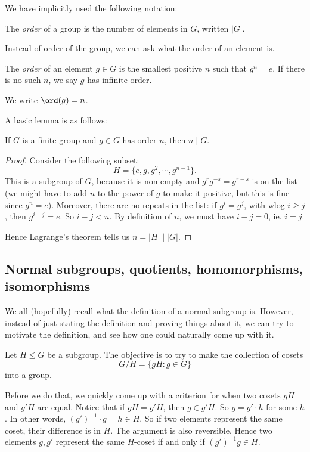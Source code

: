 \documentclass[a4paper]{article}
\begin{document}
We have implicitly used the following notation:
\begin{defi}
  The \emph{order} of a group is the number of elements in $G$, written $|G|$.
\end{defi}

Instead of order of the group, we can ask what the order of an element is.
\begin{defi}
  The \emph{order} of an element $g \in G$ is the smallest positive $n$ such that $g^n = e$. If there is no such $n$, we say $g$ has infinite order.

  We write $\ord(g) = n$.
\end{defi}

A basic lemma is as follows:
\begin{lemma}
  If $G$ is a finite group and $g \in G$ has order $n$, then $n \mid G$.
\end{lemma}

\begin{proof}
  Consider the following subset:
  \[
    H= \{e, g, g^2, \cdots, g^{n - 1}\}.
  \]
  This is a subgroup of $G$, because it is non-empty and $g^rg^{-s} = g^{r - s}$ is on the list (we might have to add $n$ to the power of $g$ to make it positive, but this is fine since $g^n = e$). Moreover, there are no repeats in the list: if $g^i = g^j$, with wlog $i \geq j$, then $g^{i - j} = e$. So $i - j < n$. By definition of $n$, we must have $i - j = 0$, ie. $i = j$.

  Hence Lagrange's theorem tells us $n = |H| \mid |G|$.
\end{proof}

\subsection{Normal subgroups, quotients, homomorphisms, isomorphisms}
We all (hopefully) recall what the definition of a normal subgroup is. However, instead of just stating the definition and proving things about it, we can try to motivate the definition, and see how one could naturally come up with it.

Let $H \leq G$ be a subgroup. The objective is to try to make the collection of cosets
\[
  G/H = \{gH: g \in G\}
\]
into a group.

Before we do that, we quickly come up with a criterion for when two cosets $gH$ and $g'H$ are equal. Notice that if $gH = g'H$, then $g \in g'H$. So $g = g'\cdot h$ for some $h$. In other words, $(g')^{-1} \cdot g = h \in H$. So if two elements represent the same coset, their difference is in $H$. The argument is also reversible. Hence two elements $g, g'$ represent the same $H$-coset if and only if $(g')^{-1} g \in H$.
\end{document}
